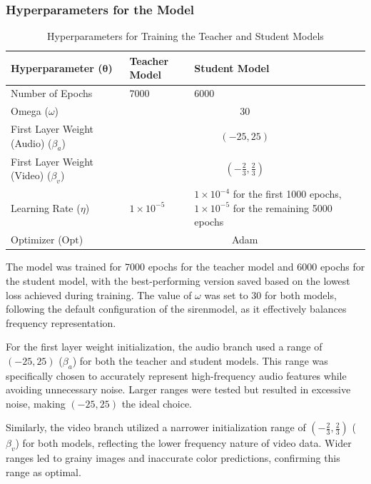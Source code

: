 \documentclass{ioereport}
\begin{document}
\subsubsection{Hyperparameters for the Model}
\begin{table}[H]
    \centering
    \caption{Hyperparameters for Training the Teacher and Student Models}
    \begin{tabular}{|l|p{}|p{}|}
    \hline
    \textbf{Hyperparameter ($\boldsymbol{\theta}$)} & \textbf{Teacher Model} & \textbf{Student Model}  \\
    \hline
    Number of Epochs                   & 7000                    & 6000                    \\
    \hline
    \multicolumn{1}{|l|}{Omega ($\omega$)} & \multicolumn{2}{c|}{30}  \\
    \hline
    \multicolumn{1}{|l|}{First Layer Weight (Audio) ($\beta_a$)} & \multicolumn{2}{c|}{$(-25, 25)$} \\
    \hline
    \multicolumn{1}{|l|}{First Layer Weight (Video) ($\beta_v$)} & \multicolumn{2}{c|}{$\left(-\frac{2}{3}, \frac{2}{3}\right)$} \\
    \hline
    Learning Rate ($\eta$)              & $1\times10^{-5}$       & $1\times10^{-4}$ for the first 1000 epochs, $1\times10^{-5}$ for the remaining 5000 epochs \\
    \hline
    \multicolumn{1}{|l|}{Optimizer ($\text{Opt}$)} & \multicolumn{2}{c|}{Adam} \\
    \hline
    \end{tabular}
    \label{tab:teacher_student_model_hyperparams}
\end{table}
    
The model was trained for 7000 epochs for the teacher model and 6000 epochs for the student model, with the best-performing version saved based on the lowest loss achieved during training. The value of $\omega$ was set to 30 for both models, following the default configuration of the \gls{siren}model, as it effectively balances frequency representation.

For the first layer weight initialization, the audio branch used a range of $(-25, 25)$ ($\beta_a$) for both the teacher and student models. This range was specifically chosen to accurately represent high-frequency audio features while avoiding unnecessary noise. Larger ranges were tested but resulted in excessive noise, making $(-25, 25)$ the ideal choice.

Similarly, the video branch utilized a narrower initialization range of $\left(-\frac{2}{3}, \frac{2}{3}\right)$ ($\beta_v$) for both models, reflecting the lower frequency nature of video data. Wider ranges led to grainy images and inaccurate color predictions, confirming this range as optimal.
\end{document}
